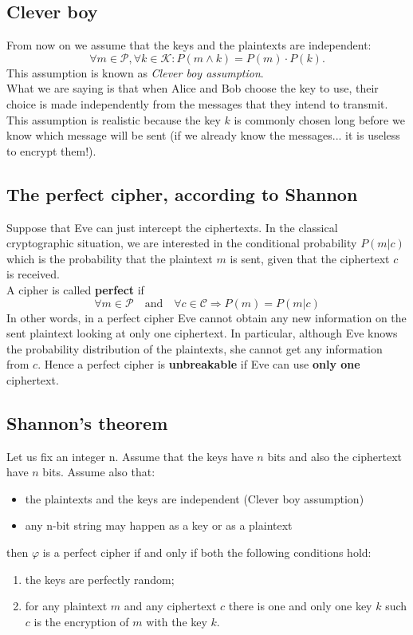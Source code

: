 \documentclass[a4paper, 10pt, titlepage]{article}
\begin{document}
\subsection{Clever boy}
From now on we assume that the keys and the plaintexts are independent:
$$\forall m \in \mathcal{P}, \forall k \in \mathcal{K} : P(m \wedge k) = P(m) \cdot P(k).$$
This assumption is known as \textit{Clever boy assumption}.\\
What we are saying is that when Alice and Bob choose the key to use,
their choice is made independently from the messages that they intend to transmit. This assumption is realistic because the key $k$ is commonly chosen long before we know which message will be sent (if we already know the messages... it is useless to encrypt them!).

\subsection{The perfect cipher, according to Shannon}
Suppose that Eve can just intercept the ciphertexts. In the classical cryptographic situation, we are interested in the conditional probability $P(m|c)$ which is the probability that the plaintext $m$ is sent, given that the ciphertext $c$ is received. \\
A cipher is called \textbf{perfect} if
$$\forall m \in \mathcal{P} \quad \text{and} \quad \forall c \in \mathcal{C} \Rightarrow P(m) = P(m|c)$$
In other words, in a perfect cipher Eve cannot obtain any new information on the sent plaintext looking at only one ciphertext.
In particular, although Eve knows the probability distribution of the plaintexts, she cannot get any information from $c$. Hence a perfect cipher is \textbf{unbreakable} if Eve can use \textbf{only one} ciphertext.

\subsection{Shannon's theorem}
Let us fix an integer n. Assume that the keys have $n$ bits and also the ciphertext have $n$ bits.
Assume also that:
\begin{itemize}
\item the plaintexts and the keys are independent (Clever boy assumption)
\item any n-bit string may happen as a key or as a plaintext
\end{itemize}
then $\varphi$ is a perfect cipher if and only if both the following conditions hold:
\begin{enumerate}
\item the keys are perfectly random;
\item for any plaintext $m$ and any ciphertext $c$ there is one and only one key $k$ such $c$ is the encryption of $m$ with the key $k$.
\end{enumerate}
\end{document}
